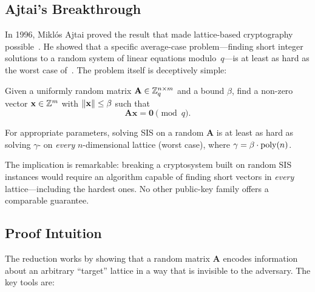 \subsection{Ajtai's Breakthrough}
\label{subsec:ajtai}

In 1996, Mikl\'os Ajtai proved the result that made lattice-based cryptography possible~\cite{Ajtai1996}.  He showed that a specific average-case problem---finding short integer solutions to a random system of linear equations modulo~$q$---is at least as hard as the worst case of~\sivp{}.  The problem itself is deceptively simple:

\begin{definition}
\label{def:sis}
Given a uniformly random matrix $\mathbf{A}\in\mathbb{Z}_q^{n\times m}$ and a bound $\beta$, find a non-zero vector $\mathbf{x}\in\mathbb{Z}^m$ with $\left\lVert \mathbf{x} \right\rVert\leq\beta$ such that
\begin{equation}
\mathbf{A}\mathbf{x} = \mathbf{0} \pmod{q}.
\end{equation}
\end{definition}

\begin{theorem}
\label{thm:ajtai}
For appropriate parameters, solving \textsc{SIS} on a random $\mathbf{A}$ is at least as hard as solving $\gamma$-\sivp{} on \emph{every} $n$-dimensional lattice (worst case), where $\gamma = \beta\cdot\operatorname{poly}(n)$.
\end{theorem}

The implication is remarkable: breaking a cryptosystem built on random \textsc{SIS} instances would require an algorithm capable of finding short vectors in \emph{every} lattice---including the hardest ones.  No other public-key family offers a comparable guarantee.


\subsection{Proof Intuition}
\label{subsec:reduction-intuition}

The reduction works by showing that a random matrix $\mathbf{A}$ encodes information about an arbitrary ``target'' lattice in a way that is invisible to the adversary.  The key tools are:

